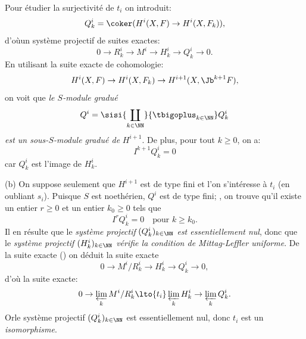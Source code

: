 Pour \'etudier la surjectivit\'e de $t_i$ on introduit:
\begin{equation} \label{eq:IX.1.21} Q_k^i = \coker (H^i(X, F) \to H^i(X, F_k)),
\end{equation}
d'o\`u\pageoriginale un syst\`eme projectif de suites exactes:
\begin{equation} \label{eq:IX.1.22} 0\to R_k^i \to M^i \to H^i_k \to Q_k^i \to 0.
\end{equation}
En utilisant la suite exacte de cohomologie:
\begin{equation} \label{eq:IX.1.23}
H^i(X, F)\to H^i(X, F_k)\to H^{i+1}(X, {\Jb}^{k+1}F),
\end{equation}
on voit que \emph{le $S$-module gradu\'e}
\begin{equation} \label{eq:IX.1.24}
Q^i=\sisi{\coprod_{k \in \NN}}{\tbigoplus_{k \in \NN}}Q^i_k
\end{equation}
\emph{est un sous-}$S$\emph{-module gradu\'e de} $H^{i+1}$. De plus, pour tout $k\geq 0$, on a:
\begin{equation} \label{eq:IX.1.25}
I^{k+1}Q^i_k=0
\end{equation}
car $Q_k^i$ est l'image de $H^i_k$.

\textup{(b)} \label{stepb} On suppose seulement que $H^{i+1}$ est de type fini et l'on s'int\'eresse \`a $t_i$ (en oubliant $s_i$). Puisque $S$ est noeth\'erien, $Q^i$ est de type fini; , on trouve qu'il existe un entier $r\geq 0$ et un entier $k_0\geq 0$ tels que
\begin{equation} \label{eq:IX.1.26}
I^rQ_k^i=0 \quad \text{pour } k\geq k_0.
\end{equation}
Il en r\'esulte que le \emph{syst\`eme projectif} $(Q_k^i)_{k\in \NN}$ \emph{est essentiellement nul}, donc que le \emph{syst\`eme projectif $(H_k^i)_{k\in \NN}$ v\'erifie la condition de Mittag-Leffler uniforme}. De la suite exacte () on d\'eduit la suite exacte
\begin{equation} \label{eq:IX.1.27}
0 \to M^i/R_k^i \to H^i_k \to Q_k^i \to 0,
\end{equation}
d'o\`u la suite exacte:
\begin{equation} \label{eq:IX.1.28}
0\to\varprojlim_{k}M^i/R_k^i \lto{t_i} \varprojlim_{k}H^i_k \to \varprojlim_{k} Q_k^i.
\end{equation}
Or\pageoriginale le syst\`eme projectif $(Q_k^i)_{k\in \NN}$ est essentiellement nul, donc $t_i$ est un \emph{isomorphisme}.

